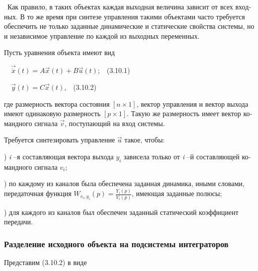 \documentclass[a4paper]{article}
\begin{document}
{\begin{russian}\sffamily
\ Как правило, в таких объектах каждая выходная величина зависит от всех входных. В то же время при синтезе управления
такими объектами часто требуется обеспечить не только заданные динамические и статические свойства системы, но и
независимое управление по каждой из выходных переменных.
\end{russian}}

{\begin{russian}\sffamily
Пусть уравнения объекта имеют вид
\end{russian}}

{\begin{russian}\sffamily
\ \  $\vec{\dot x}(t)=A\vec x(t)+B\vec u(t)$;\ \ (3.10.1)
\end{russian}}

{\begin{russian}\sffamily
\ \  $\vec y(t)=C\vec x(t)$,\ \ (3.10.2)
\end{russian}}

{\begin{russian}\sffamily
где размерность вектора состояния  $[n\times 1]$, вектор управления и вектор выхода имеют одинаковую размерность 
$[p\times 1]$. Такую же размерность имеет вектор командного сигнала  $\vec v$, поступающий на вход системы. 
\end{russian}}

{\begin{russian}\sffamily
Требуется синтезировать управление  $\vec u$ такое, чтобы:
\end{russian}}

{\begin{russian}) \textit{i }–я составляющая вектора выхода  $y_i$ зависела только от \textit{i} –й составляющей командного сигнала 
$v_i$;
\end{russian}}

{\begin{russian}) по каждому из каналов была обеспечена заданная динамика, иными словами, передаточная функция 
$W_{v_i,y_i}(p)=\frac{Y_i(p)}{V_i(p)}$, имеющая заданные полюсы;
\end{russian}}

{\begin{russian}) для каждого из каналов был обеспечен заданный статический коэффициент передачи.
\end{russian}}


\bigskip

\subsubsection{Разделение исходного объекта на подсистемы интеграторов}
\hypertarget{RefHeadingToc455659745}{}{\begin{russian}\sffamily
Представим (3.10.2) в виде
\end{russian}}
\end{document}
